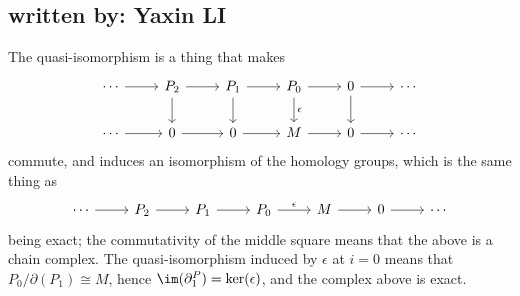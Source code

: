 \subsection{written by: Yaxin LI}
The quasi-isomorphism is a thing that makes
\[
\begin{tikzcd}
    \cdots \arrow[r] & P_2 \arrow[d] \arrow[r] & P_1 \arrow[d] \arrow[r] & P_0 \arrow[d,"\epsilon"] \arrow[r] & 0 \arrow[r] \arrow[d] & \cdots \\
    \cdots \arrow[r] & 0 \arrow[r]             & 0 \arrow[r]             & M \arrow[r]             & 0 \arrow[r]           & \cdots
    \end{tikzcd}
\]
commute, and induces an isomorphism of the homology groups, which is the same thing as
\[
\begin{tikzcd}
    \cdots \arrow[r] & P_2 \arrow[r] & P_1 \arrow[r] & P_0 \arrow[r,"\epsilon"] & M \arrow[r] & 0 \arrow[r] & \cdots
    \end{tikzcd}
\]
being exact; the commutativity of the middle square means that the above is a chain complex. The quasi-isomorphism induced by $\epsilon$ at $i=0$ means that $P_0/\partial(P_1)\cong M$, hence $\im(\partial_1^P)=\ker(\epsilon)$, and the complex above is exact.